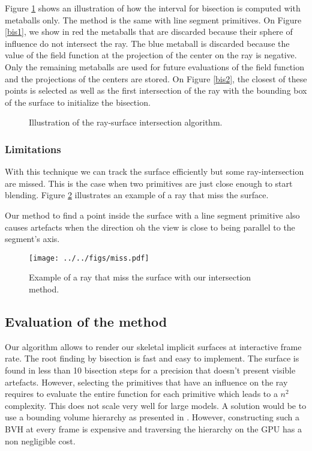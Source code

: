 \documentclass[annual]{acmsiggraph}
\begin{document}
Figure \ref{bisection} shows an illustration of how the interval for bisection is computed with metaballs only. The method is the same with line segment primitives.
On Figure \ref{bis1}, we show in red the metaballs that are discarded because their sphere of influence do not intersect the ray. The blue metaball is discarded because the value of the field function at the projection of the center on the ray is negative. Only the remaining metaballs are used for future evaluations of the field function and the projections of the centers are stored.
On Figure \ref{bis2}, the closest of these points is selected as well as the first intersection of the ray with the bounding box of the surface to initialize the bisection. 

\begin{figure}[ht]
  \centering
  \caption{Illustration of the ray-surface intersection algorithm.}
  \label{bisection}
\end{figure}

\subsubsection{Limitations}

With this technique we can track the surface efficiently but some ray-intersection are missed.
This is the case when two primitives are just close enough to start blending. Figure \ref{miss} illustrates an example of a ray that miss the surface.

Our method to find a point inside the surface with a line segment primitive also causes artefacts when the direction oh the view is close to being parallel to the segment's axis.

\begin{figure}[ht]
  \centering
  \texttt{[image: ../../figs/miss.pdf]}
    \caption{Example of a ray that miss the surface with our intersection method.}
  \label{miss}
\end{figure}



\subsection{Evaluation of the method}

Our algorithm allows to render our skeletal implicit surfaces at interactive frame rate.
The root finding by bisection is fast and easy to implement. The surface is found in less than 10 bisection steps for a precision that doesn't  present visible artefacts.
However, selecting the primitives that have an influence on the ray requires to evaluate the entire function for each primitive which leads to a $n^2$ complexity. This does not scale very well for large models. A solution would be to use a bounding volume hierarchy as presented in \cite{Gourmel-2010-FBVH}. However, constructing such a BVH at every frame is expensive and traversing the hierarchy on the GPU has a non negligible cost.
\end{document}
